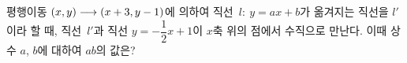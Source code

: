 평행이동 $(x{,}\mkern3mu\mathopen{}y)\longrightarrow(x+3{,}\mkern3mu\mathopen{}y-1)$에 의하여 직선~$l:\ y=ax+b$가 옮겨지는 직선을 $l'$이라 할 때, 직선~$l'$과 직선 $y=-\dfrac{1}{2}x+1$이 $x$축 위의 점에서 수직으로 만난다. 이때 상수 $a$, $b$에 대하여 $ab$의 값은?

